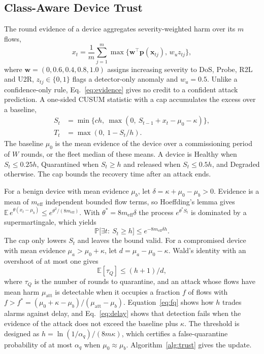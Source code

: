 \documentclass[journal]{IEEEtran}
\newcommand{\Pbb}{\mathbb{P}}
\newcommand{\Ebb}{\mathbb{E}}
\begin{document}
\subsection{Class-Aware Device Trust}
The round evidence of a device aggregates severity-weighted harm over its $m$ flows,
\begin{equation}
x_t=\frac{1}{m}\sum_{j=1}^{m}\max\big\{\mathbf{w}^{\top}\mathbf{p}(\mathbf{x}_{tj}),\,w_u z_{tj}\big\},
\label{eq:evidence}
\end{equation}
where $\mathbf{w}=(0,0.6,0.4,0.8,1.0)$ assigns increasing severity to DoS, Probe, R2L and U2R, $z_{tj}\in\{0,1\}$ flags a detector-only anomaly and $w_u=0.5$. Unlike a confidence-only rule, Eq.~\eqref{eq:evidence} gives no credit to a confident attack prediction. A one-sided CUSUM statistic with a cap accumulates the excess over a baseline,
\begin{align}
S_t&=\min\{ch,\ \max(0,\ S_{t-1}+x_t-\mu_0-\kappa)\},\label{eq:cusum}\\
T_t&=\max(0,\ 1-S_t/h).\nonumber
\end{align}
The baseline $\mu_0$ is the mean evidence of the device over a commissioning period of $W$ rounds, or the fleet median of these means. A device is Healthy when $S_t\le0.25h$, Quarantined when $S_t\ge h$ and released when $S_t\le0.5h$, and Degraded otherwise. The cap bounds the recovery time after an attack ends.

For a benign device with mean evidence $\mu_b$, let $\delta=\kappa+\mu_0-\mu_b>0$. Evidence is a mean of $m_{\mathrm{eff}}$ independent bounded flow terms, so Hoeffding's lemma \cite{hoeffding1963probability} gives $\Ebb\,e^{\theta(x_t-\mu_b)}\le e^{\theta^{2}/(8m_{\mathrm{eff}})}$. With $\theta^{*}=8m_{\mathrm{eff}}\delta$ the process $e^{\theta^{*}S_t}$ is dominated by a supermartingale, which yields
\begin{equation}
\Pbb\big[\exists t:\ S_t\ge h\big]\le e^{-8m_{\mathrm{eff}}\delta h}.
\label{eq:fq}
\end{equation}
The cap only lowers $S_t$ and leaves the bound valid. For a compromised device with mean evidence $\mu_a>\mu_0+\kappa$, let $d=\mu_a-\mu_0-\kappa$. Wald's identity with an overshoot of at most one gives
\begin{equation}
\Ebb[\tau_Q]\le (h+1)/d,
\label{eq:delay}
\end{equation}
where $\tau_Q$ is the number of rounds to quarantine, and an attack whose flows have mean harm $\mu_{\mathrm{att}}$ is detectable when it occupies a fraction $f$ of flows with $f>f^{*}=(\mu_0+\kappa-\mu_b)/(\mu_{\mathrm{att}}-\mu_b)$. Equation~\eqref{eq:fq} shows how $h$ trades alarms against delay, and Eq.~\eqref{eq:delay} shows that detection fails when the evidence of the attack does not exceed the baseline plus $\kappa$. The threshold is designed as $h=\ln(1/\alpha_q)/(8m\kappa)$, which certifies a false-quarantine probability of at most $\alpha_q$ when $\mu_0\approx\mu_b$. Algorithm~\ref{alg:trust} gives the update.
\end{document}
